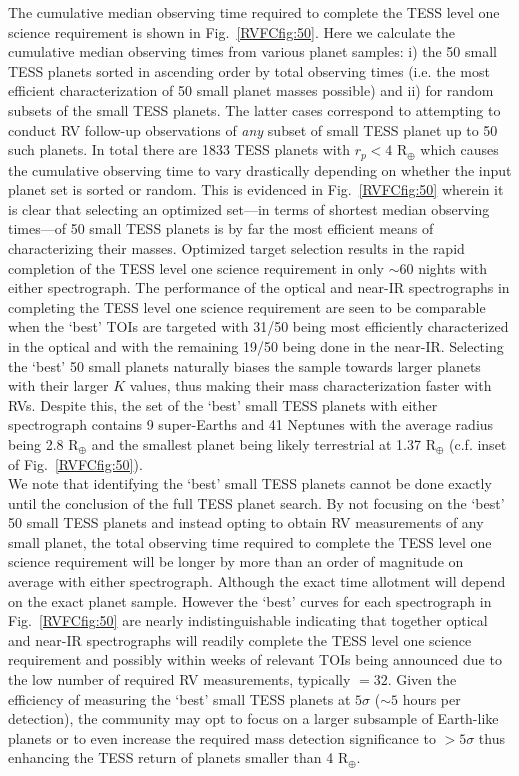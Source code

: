 The cumulative median observing time required to complete the TESS level one science requirement is shown
in Fig.~\ref{RVFCfig:50}. Here we calculate the cumulative median observing times from various planet samples:
i) the 50 small TESS planets sorted in ascending order by total observing times
(i.e. the most efficient characterization of 50 small planet masses possible) and ii)
for random subsets of the small TESS planets.
The latter cases correspond to attempting to conduct RV follow-up observations of
\emph{any} subset of small TESS planet up to 50 such planets. In total there are 1833 TESS planets with
$r_p < 4$ R$_{\oplus}$ which causes the cumulative observing time to vary drastically depending on
whether the input planet set is sorted or random. This is evidenced in Fig.~\ref{RVFCfig:50} wherein it is
clear that selecting an optimized set---in terms of shortest median observing times---of 50 small TESS planets
is by far the most efficient means of characterizing their masses. Optimized target selection results in the
rapid completion of the TESS level one science requirement in only $\sim 60$ nights with either spectrograph.
The performance of the optical and near-IR spectrographs in completing the TESS level one science
requirement are seen to be comparable when the `best' TOIs are targeted with 31/50 being most efficiently
characterized in the optical and with the remaining 19/50 being done in the near-IR. Selecting
the `best' 50 small planets naturally biases the sample towards larger planets with their larger $K$ values, 
thus making their mass characterization faster with RVs. Despite this, the set of the `best' small TESS planets
with either spectrograph contains 9 super-Earths and 41 Neptunes with the average radius being 2.8 R$_{\oplus}$
and the smallest planet being likely terrestrial at 1.37 R$_{\oplus}$ (c.f. inset of Fig.~\ref{RVFCfig:50}). \\

We note that identifying the `best' small TESS planets cannot be done exactly
until the conclusion of the full TESS planet search. By not focusing on the `best' 50 small
TESS planets and instead opting to obtain RV measurements of any small planet, the total observing time
required to complete the TESS level one science requirement will be longer by more than an order of magnitude
on average with either spectrograph. Although the exact time allotment will depend on the exact
planet sample. However the `best' curves for each spectrograph in Fig.~\ref{RVFCfig:50} are nearly
indistinguishable indicating that together optical and near-IR spectrographs will readily complete the TESS
level one science requirement and possibly within weeks of relevant TOIs being announced due to the low number
of required RV measurements, typically \nrv{}$=32$.
Given the efficiency of measuring the `best' small TESS planets at $5\sigma$ ($\sim 5$ hours per
detection), the community may opt to focus on a larger subsample of Earth-like planets or to even increase the
required mass detection significance to $> 5\sigma$ thus enhancing the TESS return of planets smaller than
4 R$_{\oplus}$.

